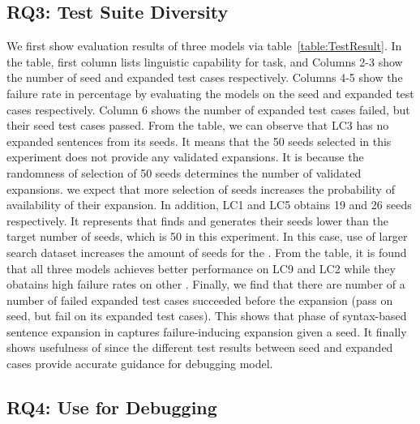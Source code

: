 \subsection{RQ3: Test Suite Diversity}

We first show evaluation results of three \sa models via
table~\ref{table:TestResult}. In the table, first column lists
linguistic capability for \sa task, and Columns 2-3 show the number of
seed and expanded test cases respectively. Columns 4-5 show the
failure rate in percentage by evaluating the \sa models on the seed
and expanded test cases respectively. Column 6 shows the number of
expanded test cases failed, but their seed test cases passed.  From
the table, we can observe that LC3 has no expanded sentences from its
seeds. It means that the 50 seeds selected in this experiment does not
provide any validated expansions. It is because the randomness of
selection of 50 seeds determines the number of validated
expansions. we expect that more selection of seeds increases the
probability of availability of their expansion. In addition, LC1 and
LC5 obtains 19 and 26 seeds respectively. It represents that \tool
finds and generates their seeds lower than the target number of seeds,
which is 50 in this experiment. In this case, use of larger search
dataset increases the amount of seeds for the \lcs. From the table, it
is found that all three models achieves better performance on LC9 and
LC2 while they obatains high failure rates on other \lcs. Finally, we
find that there are number of a number of failed expanded test cases
succeeded before the expansion (pass on seed, but fail on its expanded
test cases). This shows that phase of syntax-based sentence expansion
in \tool captures failure-inducing expansion given a seed. It finally
shows usefulness of \tool since the different test results between
seed and expanded cases provide accurate guidance for debugging model.



\subsection{RQ4: Use \tool for Debugging}
